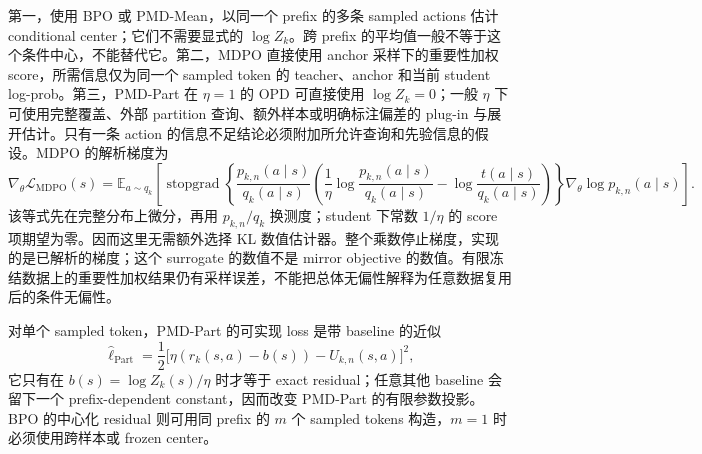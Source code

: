 \documentclass[lang=cn,scheme=chinese,openany]{../book/elegantbook}
\newcommand{\sg}{\operatorname{stopgrad}}
\begin{document}
第一，使用 BPO 或 PMD-Mean，以同一个 prefix 的多条 sampled actions 估计 conditional center；它们不需要显式的 $\log Z_k$。跨 prefix 的平均值一般不等于这个条件中心，不能替代它。第二，MDPO 直接使用 anchor 采样下的重要性加权 score，所需信息仅为同一个 sampled token 的 teacher、anchor 和当前 student log-prob。第三，PMD-Part 在 $\eta=1$ 的 OPD 可直接使用 $\log Z_k=0$；一般 $\eta$ 下可使用完整覆盖、外部 partition 查询、额外样本或明确标注偏差的 plug-in 与展开估计。只有一条 action 的信息不足结论必须附加所允许查询和先验信息的假设。MDPO 的解析梯度为
\begin{equation}
\nabla_\theta\mathcal L_{\mathrm{MDPO}}(s)
=\mathbb E_{a\sim q_k}\!\left[
\sg\!\left\{
\frac{p_{k,n}(a\mid s)}{q_k(a\mid s)}
\left(\frac{1}{\eta}\log\frac{p_{k,n}(a\mid s)}{q_k(a\mid s)}
-\log\frac{t(a\mid s)}{q_k(a\mid s)}\right)
\right\}\nabla_\theta\log p_{k,n}(a\mid s)\right].
\end{equation}
该等式先在完整分布上微分，再用 $p_{k,n}/q_k$ 换测度；student 下常数 $1/\eta$ 的 score 项期望为零。因而这里无需额外选择 KL 数值估计器。整个乘数停止梯度，实现的是已解析的梯度；这个 surrogate 的数值不是 mirror objective 的数值。有限冻结数据上的重要性加权结果仍有采样误差，不能把总体无偏性解释为任意数据复用后的条件无偏性。

对单个 sampled token，PMD-Part 的可实现 loss 是带 baseline 的近似
\begin{equation}
\widehat\ell_{\mathrm{Part}}=\frac12\bigl[\eta(r_k(s,a)-b(s))-U_{k,n}(s,a)\bigr]^2,
\end{equation}
它只有在 $b(s)=\log Z_k(s)/\eta$ 时才等于 exact residual；任意其他 baseline 会留下一个 prefix-dependent constant，因而改变 PMD-Part 的有限参数投影。BPO 的中心化 residual 则可用同 prefix 的 $m$ 个 sampled tokens 构造，$m=1$ 时必须使用跨样本或 frozen center。
\end{document}
